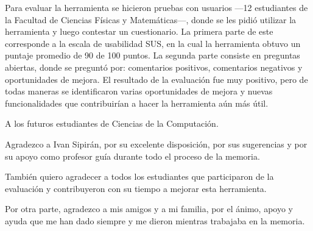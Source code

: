 \documentclass{umemoria}
\begin{document}
\begin{resumen}
Para evaluar la herramienta se hicieron pruebas con usuarios ---12 estudiantes de la Facultad de Ciencias Físicas y Matemáticas---, donde se les pidió utilizar la herramienta y luego contestar un cuestionario. La primera parte de este corresponde a la escala de usabilidad SUS, en la cual la herramienta obtuvo un puntaje promedio de 90 de 100 puntos. La segunda parte consiste en preguntas abiertas, donde se preguntó por: comentarios positivos, comentarios negativos y oportunidades de mejora. El resultado de la evaluación fue muy positivo, pero de todas maneras se identificaron varias oportunidades de mejora y nuevas funcionalidades que contribuirían a hacer la herramienta aún más útil.
\end{resumen}


\begin{dedicatoria}
A los futuros estudiantes de Ciencias de la Computación.
\end{dedicatoria}

\begin{thanks}

Agradezco a Ivan Sipirán, por su excelente disposición, por sus sugerencias y por su apoyo como profesor guía durante todo el proceso de la memoria.

También quiero agradecer a todos los estudiantes que participaron de la evaluación y contribuyeron con su tiempo a mejorar esta herramienta.

Por otra parte, agradezco a mis amigos y a mi familia, por el ánimo, apoyo y ayuda que me han dado siempre y me dieron mientras trabajaba en la memoria.



\end{thanks}

\setcounter{tocdepth}{1}
\tableofcontents
\listoffigures %
\listoftables %
\end{document}
